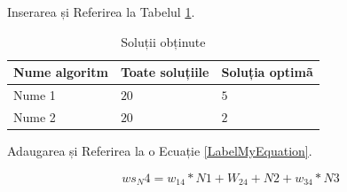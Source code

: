 Inserarea și Referirea la Tabelul \ref{TabelSolutii}. 

\begin{table}[htbp]
\begin{center}
\begin{tabular}
{|p{120pt}|p{120pt}|p{120pt}|}
\hline
 Nume algoritm  &  Toate soluțiile &  Soluția optimã\\
\hline 
\hline Nume 1 & $20$ & $5$  \\
\hline Nume 2 & $20$ & $2$  \\
\hline
\end{tabular}
\end{center}
\caption{Soluții obținute }
\label{TabelSolutii}
\end{table}


Adaugarea și Referirea la o Ecuație \ref{LabelMyEquation}.


 \begin{equation}
     ws_N4 = w_{14}*N1 + W_{24}+N2 + w_{34}*N3
\label{LabelMyEquation}
 \end{equation}
